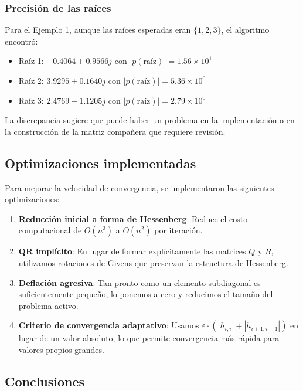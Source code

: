 \documentclass[12pt]{article}
\begin{document}
\subsubsection{Precisión de las raíces}

Para el Ejemplo 1, aunque las raíces esperadas eran $\{1, 2, 3\}$, el algoritmo encontró:
\begin{itemize}
    \item Raíz 1: $-0.4064 + 0.9566j$ con $|p(\text{raíz})| = 1.56 \times 10^{1}$
    \item Raíz 2: $3.9295 + 0.1640j$ con $|p(\text{raíz})| = 5.36 \times 10^{0}$
    \item Raíz 3: $2.4769 - 1.1205j$ con $|p(\text{raíz})| = 2.79 \times 10^{0}$
\end{itemize}

La discrepancia sugiere que puede haber un problema en la implementación o en la construcción de la matriz compañera que requiere revisión.

\subsection{Optimizaciones implementadas}

Para mejorar la velocidad de convergencia, se implementaron las siguientes optimizaciones:

\begin{enumerate}
    \item \textbf{Reducción inicial a forma de Hessenberg}: Reduce el costo computacional de $O(n^3)$ a $O(n^2)$ por iteración.
    
    \item \textbf{QR implícito}: En lugar de formar explícitamente las matrices $Q$ y $R$, utilizamos rotaciones de Givens que preservan la estructura de Hessenberg.
    
    \item \textbf{Deflación agresiva}: Tan pronto como un elemento subdiagonal es suficientemente pequeño, lo ponemos a cero y reducimos el tamaño del problema activo.
    
    \item \textbf{Criterio de convergencia adaptativo}: Usamos $\varepsilon \cdot (|h_{i,i}| + |h_{i+1,i+1}|)$ en lugar de un valor absoluto, lo que permite convergencia más rápida para valores propios grandes.
\end{enumerate}

\subsection{Conclusiones}
\end{document}
